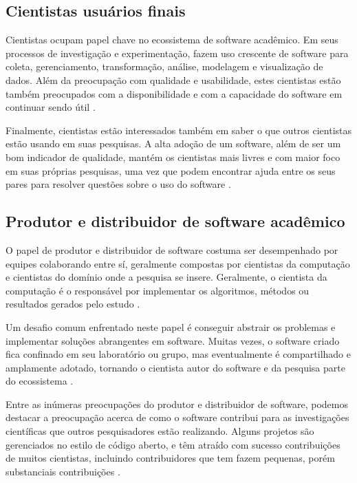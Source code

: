 \subsection{Cientistas usuários finais}

Cientistas ocupam papel chave no ecossistema de software acadêmico.  Em seus
processos de investigação e experimentação, fazem uso crescente de software
para coleta, gerenciamento, transformação, análise, modelagem e visualização de
dados. Além da preocupação com qualidade e usabilidade, estes cientistas estão
também preocupados com a disponibilidade e com a capacidade do software em
continuar sendo útil \cite{howison2015understanding}.

Finalmente, cientistas estão interessados também em saber o que outros
cientistas estão usando em suas pesquisas. A alta adoção de um software, além
de ser um bom indicador de qualidade, mantém os cientistas mais livres e com
maior foco em suas próprias pesquisas, uma vez que podem encontrar ajuda entre
os seus pares para resolver questões sobre o uso do software
\cite{howison2015understanding}.



\subsection{Produtor e distribuidor de software acadêmico}

O papel de produtor e distribuidor de software costuma ser desempenhado por
equipes colaborando entre sí, geralmente compostas por cientistas da computação
e cientistas do domínio onde a pesquisa se insere.
Geralmente, o cientista da computação é o responsável por implementar os
algoritmos, métodos ou resultados gerados pelo estudo
\cite{howison2015understanding}.

Um desafio comum enfrentado neste papel é conseguir abstrair os problemas e
implementar soluções abrangentes em software.
Muitas vezes, o software criado fica confinado em seu laboratório ou grupo, mas
eventualmente é compartilhado e amplamente adotado, tornando o cientista autor
do software e da pesquisa parte do ecossistema \cite{howison2015understanding}.

Entre as inúmeras preocupações do produtor e distribuidor de software, podemos
destacar a preocupação acerca de como o software contribui para as
investigações científicas que outros pesquisadores estão realizando.
Alguns projetos são gerenciados no estilo de código aberto, e têm atraído com
sucesso contribuições de muitos cientistas, incluindo contribuidores que tem
fazem pequenas, porém substanciais contribuições
\cite{howison2015understanding}.

